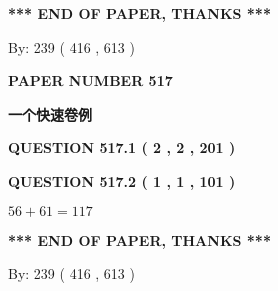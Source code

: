 \documentclass{ctexart}
\begin{document}
   
 \vspace{0.2in}
 
   
   
   
   
\vspace{1.0in} 
{\textbf{\large{ *** END OF PAPER, THANKS *** }}} 
   
   
\hspace{1.0in} By: 
 239 ( 416 ,  613 )
   
   
   
   
\newpage 
\setcounter{page}{ 
   517001 } 
   
   
   
   
 {\textbf{ \Large{ PAPER NUMBER  517  }}}
   
   
\vspace{0.2in}
   
   
   
   
   
   
 \vspace{0.2in}
{\LARGE {\textbf{ 一个快速卷例}}}
   
   
  
\vspace{0.2in}
  
{\textbf{\Large{QUESTION
517.1 
 ( 2 , 2 , 201 )
}}}
  
  
  
\vspace{0.2in}
  
{\textbf{\Large{QUESTION
517.2 
 ( 1 , 1 , 101 )
}}}
  
  
 
 

$ %
56 +  %
61=   %
117$
 
 
   
   
 \vspace{0.2in}
 
   
   
   
   
\vspace{1.0in} 
{\textbf{\large{ *** END OF PAPER, THANKS *** }}} 
   
   
\hspace{1.0in} By: 
 239 ( 416 ,  613 )
   
   
   
   
\newpage 
\setcounter{page}{ 
   518001 } 
   
   
   
\end{document}
